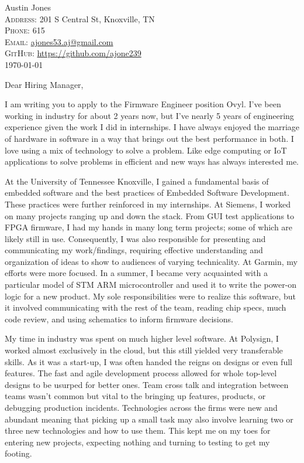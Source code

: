 \documentclass[a4paper,12pt]{article}
\begin{document}
\pagestyle{empty} %


\Huge Austin Jones\smallskip{} \\
\small \textsc{Address:} 201 S Central St, Knoxville, TN \\
\small \textsc{Phone:} 615 \\
\textsc{Email:} \href{mailto:ajones53.aj@gmail.com}{ajones53.aj@gmail.com} \\
\textsc{GitHub:} \href{https://github.com/ajone239}{https://github.com/ajone239} \\

\today

Dear Hiring Manager,

I am writing you to apply to the Firmware Engineer position Ovyl.
I've been working in industry for about 2 years now, but I've nearly 5 years of engineering experience given the work I did in internships.
I have always enjoyed the marriage of hardware in software in a way that brings out the best performance in both.
I love using a mix of technology to solve a problem.
Like edge computing or IoT applications to solve problems in efficient and new ways has always interested me.

At the University of Tennessee Knoxville, I gained a fundamental basis of embedded software and the best practices of Embedded Software Development.
These practices were further reinforced in my internships.
At Siemens, I worked on many projects ranging up and down the stack.
From GUI test applications to FPGA firmware, I had my hands in many long term projects; some of which are likely still in use.
Consequently, I was also responsible for presenting and communicating my work/findings, requiring effective understanding and organization of ideas to show to audiences of varying technicality.
At Garmin, my efforts were more focused.
In a summer, I became very acquainted with a particular model of STM ARM microcontroller and used it to write the power-on logic for a new product.
My sole responsibilities were to realize this software, but it involved communicating with the rest of the team, reading chip specs, much code review, and using schematics to inform firmware decisions.

My time in industry was spent on much higher level software.
At Polysign, I worked almost exclusively in the cloud, but this still yielded very transferable skills.
As it was a start-up, I was often handed the reigns on designs or even full features.
The fast and agile development process allowed for whole top-level designs to be usurped for better ones.
Team cross talk and integration between teams wasn't common but vital to the bringing up features, products, or debugging production incidents.
Technologies across the firms were new and abundant meaning that picking up a small task may also involve learning two or three new technologies and how to use them.
This kept me on my toes for entering new projects, expecting nothing and turning to testing to get my footing.
\end{document}
